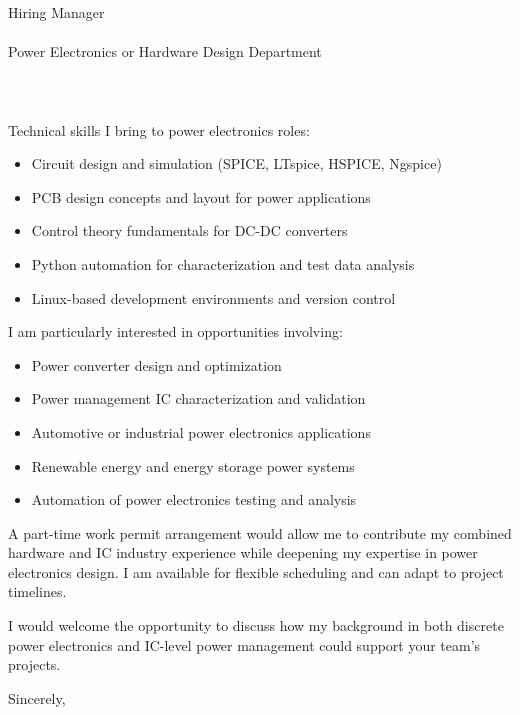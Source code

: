 \documentclass[11pt,a4paper]{letter}
\begin{document}
\begin{letter}{
    Hiring Manager\\\\
    Power Electronics or Hardware Design Department\\\\
    [Company Name]\\\\
    [Company Address]
}
Technical skills I bring to power electronics roles:
\begin{itemize}
    \item Circuit design and simulation (SPICE, LTspice, HSPICE, Ngspice)
    \item PCB design concepts and layout for power applications
    \item Control theory fundamentals for DC-DC converters
    \item Python automation for characterization and test data analysis
    \item Linux-based development environments and version control
\end{itemize}

I am particularly interested in opportunities involving:
\begin{itemize}
    \item Power converter design and optimization
    \item Power management IC characterization and validation
    \item Automotive or industrial power electronics applications
    \item Renewable energy and energy storage power systems
    \item Automation of power electronics testing and analysis
\end{itemize}

A part-time work permit arrangement would allow me to contribute my combined hardware and IC industry experience while deepening my expertise in power electronics design. I am available for flexible scheduling and can adapt to project timelines.

I would welcome the opportunity to discuss how my background in both discrete power electronics and IC-level power management could support your team's projects.

\closing{Sincerely,}

\end{letter}
\end{document}
